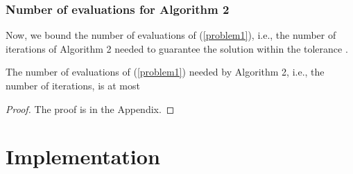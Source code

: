 \documentclass{article}
\begin{document}
\subsubsection{Number of evaluations for Algorithm 2} \label{svrp_A}

Now, we bound the number of evaluations of (\ref{problem1}), i.e., the number of iterations of Algorithm 2 needed to guarantee the solution within the tolerance .

\begin{theorem} \label{Malg2}
The number of evaluations of (\ref{problem1}) needed by Algorithm 2, i.e., the number of iterations, is at most

\end{theorem}
\begin{proof} The proof is in the Appendix.
\end{proof}

\section{Implementation} \label{implem}
  
\end{document}

